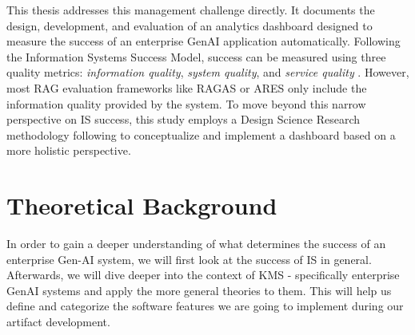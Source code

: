\documentclass[
	english,
	ruledheaders=section,%
	class=report,%
	thesis={type=bachelor},%
	accentcolor=1b,%
	custommargins=true,%
	marginpar=false,%
	parskip=half-,%
	fontsize=11pt,%
	DIV=14,
]{tudapub}
\begin{document}
This thesis addresses this management challenge directly. It documents the design, development, and evaluation of an analytics dashboard designed to measure the success of an enterprise GenAI application automatically. Following the Information Systems Success Model, success can be measured using three quality metrics: \textit{information quality}, \textit{system quality}, and \textit{service quality} \parencite[pp.~23--24]{DeloneMcLean2003ISSuccessTenYearUpdate}. However, most RAG evaluation frameworks like RAGAS \parencite{Es_James_Espinosa_Anke_Schockaert_2024} or ARES \parencite{Saad_Falcon_Khattab_Potts_Zaharia_2024} only include the information quality provided by the system. To move beyond this narrow perspective on IS success, this study employs a Design Science Research methodology following \cite{Peffers2007} to conceptualize and implement a dashboard based on a more holistic perspective.
\chapter{Theoretical Background}
In order to gain a deeper understanding of what determines the success of an enterprise Gen-AI system, we will first look at the success of IS in general. Afterwards, we will dive deeper into the context of KMS - specifically enterprise GenAI systems and apply the more general theories to them. This will help us define and categorize the software features we are going to implement during our artifact development.
\end{document}
